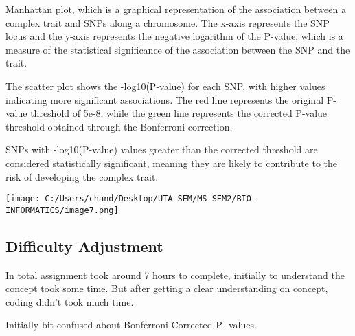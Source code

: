 \documentclass[
]{article}
\begin{document}
Manhattan plot, which is a graphical representation of the association
between a complex trait and SNPs along a chromosome. The x-axis
represents the SNP locus and the y-axis represents the negative
logarithm of the P-value, which is a measure of the statistical
significance of the association between the SNP and the trait.

The scatter plot shows the -log10(P-value) for each SNP, with higher
values indicating more significant associations. The red line represents
the original P-value threshold of 5e-8, while the green line represents
the corrected P-value threshold obtained through the Bonferroni
correction.

SNPs with -log10(P-value) values greater than the corrected threshold
are considered statistically significant, meaning they are likely to
contribute to the risk of developing the complex trait.

\texttt{[image: C:/Users/chand/Desktop/UTA-SEM/MS-SEM2/BIO-INFORMATICS/image7.png]}

\hypertarget{difficulty-adjustment}{%
\subsection{\texorpdfstring{\textbf{Difficulty
Adjustment}}{Difficulty Adjustment}}\label{difficulty-adjustment}}

In total assignment took around 7 hours to complete, initially to
understand the concept took some time. But after getting a clear
understanding on concept, coding didn't took much time.

Initially bit confused about Bonferroni Corrected P- values.
\end{document}
